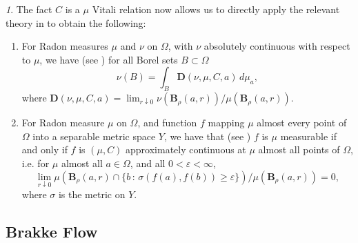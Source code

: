 \documentclass{article}
\theoremstyle{plain}
\theoremstyle{definition}
\theoremstyle{plain}
\theoremstyle{remark}
\newtheorem{propparagraph}[theorem]{}
\theoremstyle{remark}
\theoremstyle{plain}
\begin{document}
\begin{propparagraph}
    The fact $C$ is a $\mu$ Vitali relation now allows us to directly apply the relevant theory in \cite[2.9]{MR41:1976} to obtain the following:
    \begin{enumerate}[label=\ref{proppara: parabolic Besicovitch}.\arabic{enumi}]
    \item\label{propara: differentiation of Radon measures} For Radon measures $\mu$ and $\nu$ on $\Omega$, with $\nu$ absolutely continuous with respect to $\mu$, we have (see \cite[2.9.1--7]{MR41:1976}) for all Borel sets $B \subset \Omega$ 
    \begin{equation*}
        \nu (B) = \int_{B} \mathbf{D} (\nu, \mu, C, a) \, d \mu_{a},  
    \end{equation*}
    where $\mathbf{D} (\nu, \mu, C, a) = \lim_{r \downarrow 0} \nu (\mathbf{B}_{\rho} (a, r)) / \mu (\mathbf{B}_{\rho} (a, r))$.
    \item\label{proppara: approximate continuity} For Radon measure $\mu$ on $\Omega$, and function $f$ mapping $\mu$ almost every point of $\Omega$ into a separable metric space $Y$, we have that (see \cite[2.9.13]{MR41:1976}) $f$ is $\mu$ measurable if and only if $f$ is $(\mu, C)$ approximately continuous at $\mu$ almost all points of $\Omega$, i.e. for $\mu$ almost all $a \in \Omega$, and all $0 < \varepsilon < \infty$, 
    \begin{equation*}
        \lim_{r \downarrow 0} \mu (\mathbf{B}_{\rho} (a, r) \cap \{ b \, \colon \, \sigma (f (a), f (b)) \geq \varepsilon \}) / \mu (\mathbf{B}_{\rho} (a, r)) = 0,
    \end{equation*}
    where $\sigma$ is the metric on $Y$.
    \end{enumerate}
\end{propparagraph}

\subsection{Brakke Flow}\label{subsec: Brakke Flow preliminaries}
\end{document}
